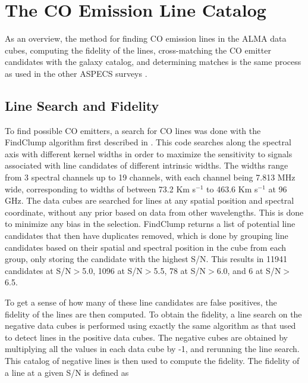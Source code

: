 \section{The CO Emission Line Catalog}

As an overview, the method for finding CO emission lines in the ALMA data cubes, computing the fidelity of the lines, cross-matching the CO emitter candidates with the galaxy catalog, and determining matches is the same process as used in the other ASPECS surveys \cite{walter2016alma, decarli2019alma, gonzalez2019alma}.

\subsection{Line Search and Fidelity}

To find possible CO emitters, a search for CO lines was done with the FindClump algorithm first described in \cite{walter2016alma}. This code searches along the spectral axis with different kernel widths in order to maximize the sensitivity to signals associated with line candidates of different intrinsic widths. The widths range from 3 spectral channels up to 19 channels, with each channel being 7.813 MHz wide, corresponding to widths of between 73.2 Km s$^{-1}$ to 463.6 Km s$^{-1}$ at 96 GHz. The data cubes are searched for lines at any spatial position and spectral coordinate, without any prior based on data from other wavelengths. This is done to minimize any bias in the selection. FindClump returns a list of potential line candidates that then have duplicates removed, which is done by grouping line candidates based on their spatial and spectral position in the cube from each group, only storing the candidate with the highest S/N. This results in 11941 candidates at S/N$>$5.0, 1096 at S/N$>$5.5, 78 at S/N$>$6.0, and 6 at S/N$>$6.5. 

To get a sense of how many of these line candidates are false positives, the fidelity of the lines are then computed. To obtain the fidelity, a line search on the negative data cubes is performed using exactly the same algorithm as that used to detect lines in the positive data cubes. The negative cubes are obtained by multiplying all the values in each data cube by -1, and rerunning the line search. This catalog of negative lines is then used to compute the fidelity. The fidelity of a line at a given S/N is defined as 

